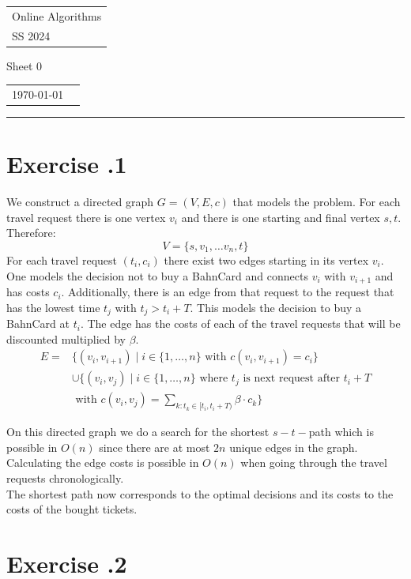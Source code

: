 \documentclass[a4paper,12pt]{scrartcl}
\newcounter{sheet}
\newcommand{\printsheet}{\arabic{sheet}}
\newcommand{\printmembers}{}
\begin{document}
{\raggedright
\begin{tabular}{l}
    Online Algorithms \\
    SS 2024 \\
\end{tabular}}
\hfill
{\Large Sheet 0\printsheet}
\hfill
\begin{tabular}{l l}
\today{} \\
\printmembers 
\end{tabular}
\hrule



\section*{Exercise \printsheet.1}
We construct a directed graph $G=(V,E,c)$ that models the problem. For each travel request there is one vertex $v_i$ and there is one starting and final vertex $s,t$. Therefore:
\[V=\{s, v_1, \dots v_n, t\}\]
For each travel request $(t_i,c_i)$ there exist two edges starting in its vertex $v_i$. One models the decision not to buy a BahnCard and connects $v_i$ with $v_{i+1}$ and has costs $c_i$. Additionally, there is an edge from that request to the request that has the lowest time $t_j$ with $t_j > t_i+T$. This models the decision to buy a BahnCard at $t_i$. The edge has the costs of each of the travel requests that will be discounted multiplied by $\beta$.
\begin{align*}E= & \{(v_i,v_{i+1}) \mid i \in \{1,\dots ,n\} \text{ with } c(v_i,v_{i+1}) = c_i \} \\
&\cup \{(v_i,v_j) \mid i \in \{1,\dots ,n\} \text{ where } t_j \text{ is next request after } t_i+T \\
& \text{ with } c(v_i,v_j) = \sum_{k:t_k \in [t_i,t_i+T)} \beta \cdot c_k \}\end{align*}

On this directed graph we do a search for the shortest $s-t-$path which is possible in $O(n)$ since there are at most $2n$ unique edges in the graph. Calculating the edge costs is possible in $O(n)$ when going through the travel requests chronologically. \\
The shortest path now corresponds to the optimal decisions and its costs to the costs of the bought tickets.


\section*{Exercise \printsheet.2}
\end{document}
